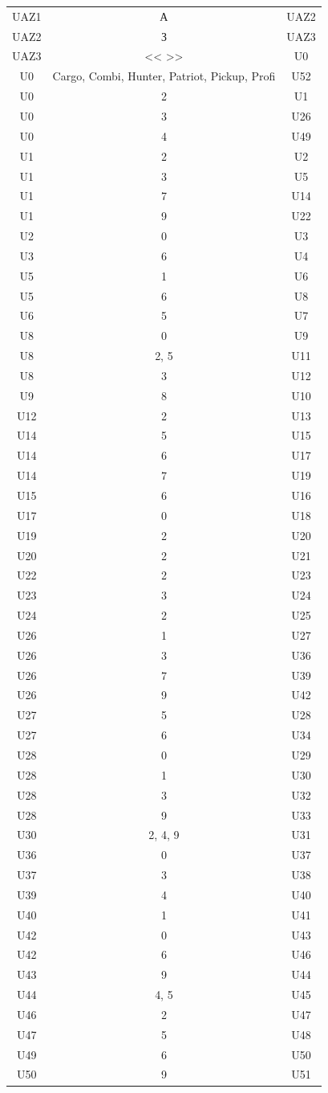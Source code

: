 \documentclass[a4paper,final]{article}
\begin{document}
\begin{longtable}{|c|c|c|}
UAZ1 & А & UAZ2 \\
UAZ2 & З & UAZ3 \\
UAZ3 & << >> & U0 \\
U0 & \parbox{7cm}{Cargo, Combi, Hunter, Patriot, Pickup, Profi} & U52 \\
U0 & 2 & U1 \\
U0 & 3 & U26 \\
U0 & 4 & U49 \\
U1 & 2 & U2 \\
U1 & 3 & U5 \\
U1 & 7 & U14 \\
U1 & 9 & U22 \\
U2 & 0 & U3 \\
U3 & 6 & U4 \\
U5 & 1 & U6 \\
U5 & 6 & U8 \\
U6 & 5 & U7 \\
U8 & 0 & U9 \\
U8 & 2, 5 & U11 \\
U8 & 3 & U12 \\
U9 & 8 & U10 \\
U12 & 2 & U13 \\
U14 & 5 & U15 \\
U14 & 6 & U17 \\
U14 & 7 & U19 \\
U15 & 6 & U16 \\
U17 & 0 & U18 \\
U19 & 2 & U20 \\
U20 & 2 & U21 \\
U22 & 2 & U23 \\
U23 & 3 & U24 \\
U24 & 2 & U25 \\
U26 & 1 & U27 \\
U26 & 3 & U36 \\
U26 & 7 & U39 \\
U26 & 9 & U42 \\
U27 & 5 & U28 \\
U27 & 6 & U34 \\
U28 & 0 & U29 \\
U28 & 1 & U30 \\
U28 & 3 & U32 \\
U28 & 9 & U33 \\
U30 & 2, 4, 9 & U31 \\
U36 & 0 & U37 \\
U37 & 3 & U38 \\
U39 & 4 & U40 \\
U40 & 1 & U41 \\
U42 & 0 & U43 \\
U42 & 6 & U46 \\
U43 & 9 & U44 \\
U44 & 4, 5 & U45 \\
U46 & 2 & U47 \\
U47 & 5 & U48 \\
U49 & 6 & U50 \\
U50 & 9 & U51 \\
\hline


\end{longtable}
\end{document}
